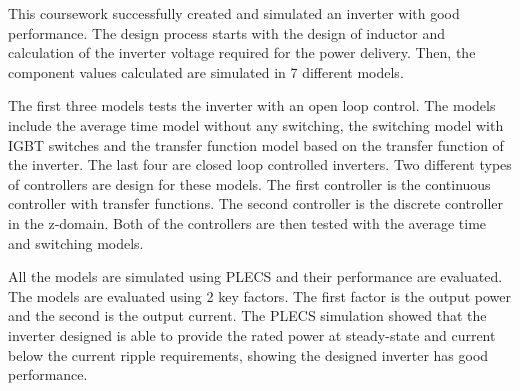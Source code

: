 \documentclass[12pt]{article}
\begin{document}
This coursework successfully created and simulated an inverter with good performance.
The design process starts with the design of inductor and calculation of the inverter voltage required for the power delivery.
Then, the component values calculated are simulated in 7 different models.

The first three models tests the inverter with an open loop control.
The models include the average time model without any switching, the switching model with IGBT switches and the transfer function model based on the transfer function of the inverter.
The last four are closed loop controlled inverters.
Two different types of controllers are design for these models.
The first controller is the continuous controller with transfer functions.
The second controller is the discrete controller in the z-domain.
Both of the controllers are then tested with the average time and switching models.

All the models are simulated using PLECS and their performance are evaluated.
The models are evaluated using 2 key factors.
The first factor is the output power and the second is the output current.
The PLECS simulation showed that the inverter designed is able to provide the rated power at steady-state and current below the current ripple requirements, showing the designed inverter has good performance.
\end{document}

